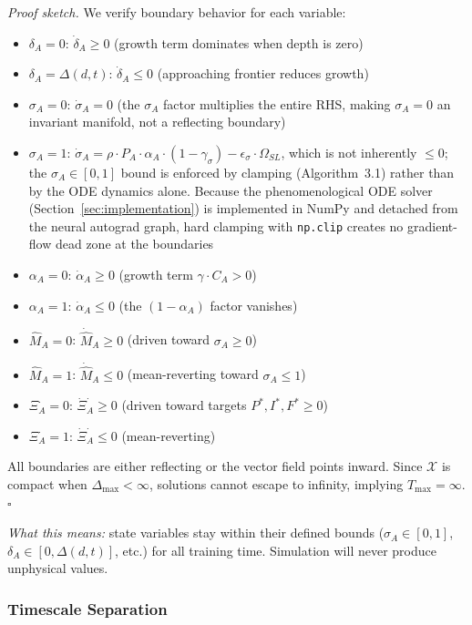 \textit{Proof sketch.} We verify boundary behavior for each variable:
\begin{itemize}[nosep]
\item $\delta_A = 0$: $\dot{\delta}_A \geq 0$ (growth term dominates when depth is zero)
\item $\delta_A = \Delta(d,t)$: $\dot{\delta}_A \leq 0$ (approaching frontier reduces growth)
\item $\sigma_A = 0$: $\dot{\sigma}_A = 0$ (the $\sigma_A$ factor multiplies the entire RHS, making $\sigma_A=0$ an invariant manifold, not a reflecting boundary)
\item $\sigma_A = 1$: $\dot{\sigma}_A = \rho \cdot P_A \cdot \alpha_A \cdot (1-\gamma_\sigma) - \epsilon_\sigma \cdot \Omega_{SL}$, which is not inherently $\leq 0$; the $\sigma_A \in [0,1]$ bound is enforced by clamping (Algorithm~3.1) rather than by the ODE dynamics alone. Because the phenomenological ODE solver (Section~\ref{sec:implementation}) is implemented in NumPy and detached from the neural autograd graph, hard clamping with \texttt{np.clip} creates no gradient-flow dead zone at the boundaries
\item $\alpha_A = 0$: $\dot{\alpha}_A \geq 0$ (growth term $\gamma \cdot C_A > 0$)
\item $\alpha_A = 1$: $\dot{\alpha}_A \leq 0$ (the $(1-\alpha_A)$ factor vanishes)
\item $\hat{M}_A = 0$: $\dot{\hat{M}}_A \geq 0$ (driven toward $\sigma_A \geq 0$)
\item $\hat{M}_A = 1$: $\dot{\hat{M}}_A \leq 0$ (mean-reverting toward $\sigma_A \leq 1$)
\item $\Xi_A^{\cdot} = 0$: $\dot{\Xi}_A^{\cdot} \geq 0$ (driven toward targets $P^*, I^*, F^* \geq 0$)
\item $\Xi_A^{\cdot} = 1$: $\dot{\Xi}_A^{\cdot} \leq 0$ (mean-reverting)
\end{itemize}
All boundaries are either reflecting or the vector field points inward.
Since $\mathcal{X}$ is compact when $\Delta_{\max} < \infty$, solutions
cannot escape to infinity, implying $T_{\max} = \infty$. $\square$

\noindent\textit{What this means:} state variables stay within their defined
bounds ($\sigma_A \in [0,1]$, $\delta_A \in [0, \Delta(d,t)]$, etc.) for all
training time. Simulation will never produce unphysical values.

\subsubsection{Timescale Separation}\label{sec:timescale}

